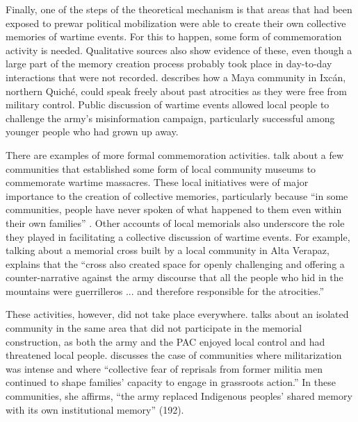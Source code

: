 \documentclass[12pt, notitlepage]{article}
\begin{document}

Finally, one of the steps of the theoretical mechanism is that areas that had been exposed to prewar political mobilization were able to create their own collective memories of wartime events.
For this to happen, some form of commemoration activity is needed.
Qualitative sources also show evidence of these, even though a large part of the memory creation process probably took place in day-to-day interactions that were not recorded.
\citet{Falla:2006vu} describes how a Maya community in Ixcán, northern Quiché, could speak freely about past atrocities as they were free from military control.
Public discussion of wartime events allowed local people to challenge the army's misinformation campaign, particularly successful among younger people who had grown up away.

There are examples of more formal commemoration activities.
\citet{Arriaza:2008wf} talk about a few communities that established some form of local community museums to commemorate wartime massacres.
These local initiatives were of major importance to the creation of collective memories, particularly because ``in some communities, people have never spoken of what happened to them even within their own families'' \citep[161]{Arriaza:2008wf}.
Other accounts of local memorials also underscore the role they played in facilitating a collective discussion of wartime events.
For example, talking about a memorial cross built by a local community in Alta Verapaz, \citet[170--171]{Viaene:2011td} explains that the ``cross also created space for openly challenging and offering a counter-narrative against the army discourse that all the people who hid in the mountains were guerrilleros ... and therefore responsible for the atrocities.''

These activities, however, did not take place everywhere.
\citet{Viaene:2011td} talks about an isolated community in the same area that did not participate in the memorial construction, as both the army and the PAC enjoyed local control and had threatened local people.
\citet[178]{Esparza:2018uw} discusses the case of communities where militarization was intense and where ``collective fear of reprisals from former militia men continued to shape families' capacity to engage in grassroots action.'' In these communities, she affirms, ``the army replaced Indigenous peoples' shared memory with its own institutional memory'' (192).
\end{document}
